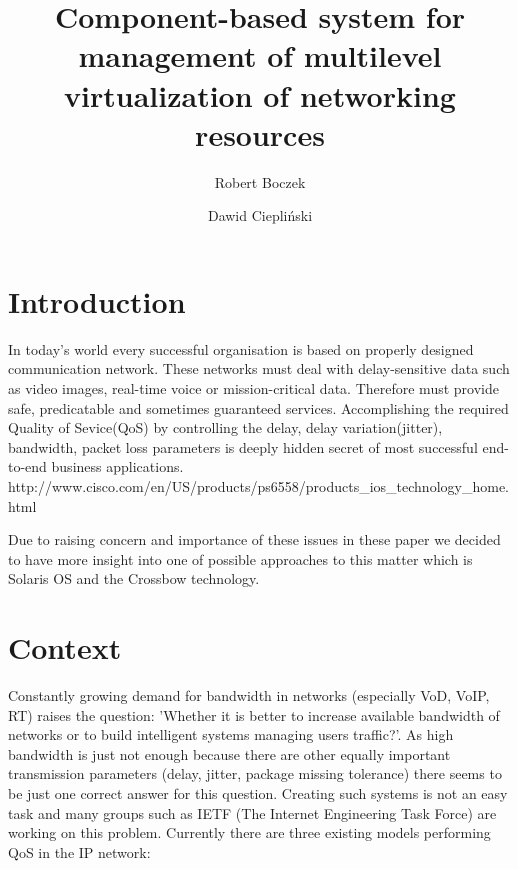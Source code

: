 \documentclass[11pt]{book}
\title{Component-based system for management of multilevel virtualization of networking resources}
\author{Robert Boczek \and Dawid Ciepliński}
\begin{document}
  \maketitle
    
  \tableofcontents

  

  \chapter{Introduction}

	
	In today's world every successful organisation is based on properly designed communication network. These networks
	must deal with delay-sensitive data such as video images, real-time voice or mission-critical data. Therefore
	must provide safe, predicatable and sometimes guaranteed services. Accomplishing the required Quality of 
	Sevice(QoS) by controlling the delay, delay variation(jitter), bandwidth, packet loss parameters is deeply 
	hidden secret of most successful end-to-end business applications. 
	http://www.cisco.com/en/US/products/ps6558/products\_ios\_technology\_home.html
	
	
	Due to raising concern and importance of these issues in these paper we decided to have more insight into one of 
	possible approaches	to this matter which is Solaris OS and the Crossbow technology. 


  \chapter{Context}  %

	Constantly growing demand for bandwidth in networks (especially VoD, VoIP, RT) raises the question: 'Whether it 
	is better to increase available bandwidth of networks or to build intelligent systems managing users traffic?'. 
	As high bandwidth is just not enough because there are other equally important transmission parameters (delay,
	jitter, package missing	tolerance) there seems to be just one correct answer for this question. Creating
	such systems is not an easy task and many groups such as IETF (The Internet Engineering Task Force) are working on this problem. 
	Currently there are three existing models performing QoS in the IP network:
\end{document}
